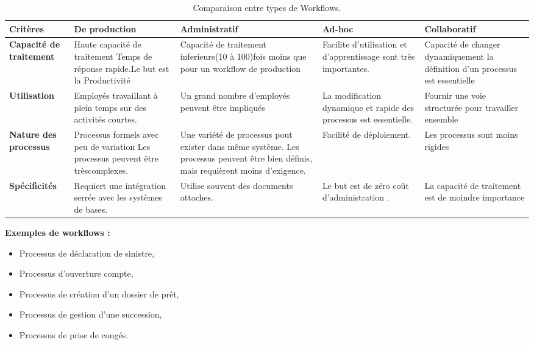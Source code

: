 \begin{center}
\begin{table}[h]
	\centering
	
	\begin{tabular}{| m{2cm} |m{8em}| m{8em} |m{6em}|m{7em}|}
		\hline
	\rowcolor[HTML]{38FFF8} 
		\textbf{Critères} & \textbf{De production} & \textbf{Administratif} & \textbf{Ad-hoc} & \textbf{Collaboratif} \\ \hline
		
		\textbf{Capacité de traitement} &   Haute capacité de traitement Temps de réponse rapide.Le but est la Productivité & Capacité de traitement inferieure(10 à 100)fois moins que pour un workflow de production &  Facilite d'utilisation et d'apprentissage sont très importantes. &   Capacité de changer dynamiquement la définition d’un processus est essentielle \\ \hline
		
	\rowcolor[HTML]{96FFFB} 
		\textbf{Utilisation} &  Employés travaillant à plein temps sur des activités  courtes. &  Un grand nombre d'employés peuvent être   impliqués & La modification dynamique et rapide des  processus est essentielle.  &  Fournir une voie structurée pour travailler ensemble  \\ \hline
		
		\textbf{ Nature des processus } & Processus formels avec peu de variation Les  processus peuvent  être trèscomplexes.&  Une variété de processus pout exister dans même système. Les processus peuvent être bien définis, mais  requièrent moins d'exigence.  & Facilité de  déploiement.&Les processus sont moins rigides \\ \hline
		
	\rowcolor[HTML]{96FFFB} 
		\textbf{Spécificités} &  Requiert une intégration serrée avec les systèmes de bases. &  Utilise souvent des documents attaches.& Le but est de zéro coût  d’administration .&La capacité de traitement est de moindre importance
		\\ \hline
	\end{tabular}
	
	\caption{Comparaison entre types de Workflows.}
	\label{tab:tabl2}
\end{table}
\end{center}
 

\textbf{Exemples de workflows :}
\begin{itemize}
	\item Processus de déclaration de sinistre,
	\item Processus d'ouverture compte,
	\item Processus de création d'un dossier de prêt,
	\item Processus de gestion d'une succession,
	\item Processus de prise de congés.
\end{itemize}
